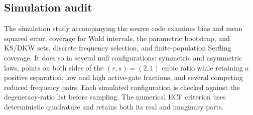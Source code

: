 \documentclass[11pt]{amsart}
\numberwithin{equation}{section}\setcounter{tocdepth}{3}\setcounter{secnumdepth}{3}
\begin{document}
\subsection{Simulation audit}\label{subsec:inference_simulation}
The simulation study accompanying the source code examines bias and mean squared error,
coverage for Wald intervals, the parametric bootstrap, and KS/DKW sets, discrete
frequency selection, and finite-population Serfling coverage.  It does so in several null
configurations: symmetric and asymmetric laws, points on both sides of the
$(r,s)=(2,1)$ cubic ratio while retaining a positive separation, low and high active-gate
fractions, and several competing reduced frequency pairs.  Each simulated configuration
is checked against the degeneracy-ratio list before sampling.  The numerical ECF
criterion uses deterministic quadrature and retains both its real and imaginary parts.
\end{document}
